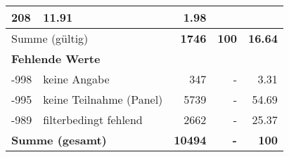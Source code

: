 \begin{longtable}{lXrrr}
       \num{208} &
       \num[round-mode=places,round-precision=2]{11.91} &
         \num[round-mode=places,round-precision=2]{1.98} \\
     \midrule
     \multicolumn{2}{l}{Summe (gültig)} &
       \textbf{\num{1746}} &
     \textbf{\num{100}} &
       \textbf{\num[round-mode=places,round-precision=2]{16.64}} \\
     \multicolumn{5}{l}{\textbf{Fehlende Werte}}\\
       -998 &
       keine Angabe &
         \num{347} &
        - &
         \num[round-mode=places,round-precision=2]{3.31} \\
       -995 &
       keine Teilnahme (Panel) &
         \num{5739} &
        - &
         \num[round-mode=places,round-precision=2]{54.69} \\
       -989 &
       filterbedingt fehlend &
         \num{2662} &
        - &
         \num[round-mode=places,round-precision=2]{25.37} \\
     \midrule
     \multicolumn{2}{l}{\textbf{Summe (gesamt)}} &
          \textbf{\num{10494}} &
        \textbf{-} &
        \textbf{\num{100}} \\
     \bottomrule
     \end{longtable}
     

